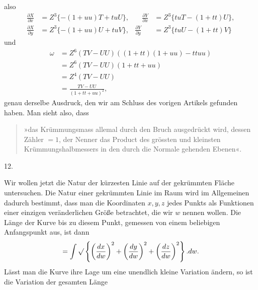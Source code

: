 %
also
\[
\begin{aligned}
\frac{\partial X}{\partial x}&=Z^{3}\{-(1+uu)T+tuU\},&\quad\frac{\partial Y}{\partial x}&=Z^{3}\{tuT-(1+tt)U\},\\
\frac{\partial X}{\partial y}&=Z^{3}\{-(1+uu)U+tuV\},&\frac{\partial Y}{\partial y}&=Z^{3}\{tuU-(1+tt)V\}
\end{aligned}
\]
und
\[
\begin{aligned}
\omega&=Z^{6}(TV-UU)((1+tt)(1+uu)-ttuu)\\
&=Z^{6}(TV-UU)(1+tt+uu)\\
&=Z^{4}(TV-UU)\\
&=\frac{TV-UU}{(1+tt+uu)^{2}},
\end{aligned}
\]
genau derselbe Ausdruck, den wir am Schluss des vorigen Artikels gefunden haben. Man sieht also, dass
\begin{quote}
»das Krümmungsmass allemal durch den Bruch ausgedrückt wird, dessen Zähler $=1$, der Nenner das Product des grössten und kleinsten Krümmungshalbmessers in den durch die Normale gehenden Ebenen«.
\end{quote}

\begin{center}12.\end{center}
\noindent\hspace*{1.2em}Wir wollen jetzt die Natur der kürzesten Linie auf der gekrümmten Fläche untersuchen. Die Natur einer gekrümmten Linie im Raum wird im Allgemeinen dadurch bestimmt, dass man die Koordinaten $x,y,z$ jedes Punkts als Funktionen einer einzigen veränderlichen Größe betrachtet, die wir $w$ nennen wollen. Die Länge der Kurve bis zu diesem Punkt, gemessen von einem beliebigen Anfangspunkt aus, ist dann
\[
=\int\mathord{\surd}\left\{\left(\frac{dx}{dw}\right)^{2}+\left(\frac{dy}{dw}\right)^{2}+\left(\frac{dz}{dw}\right)^{2}\right\}.dw.
\]
Lässt man die Kurve ihre Lage um eine unendlich kleine Variation ändern, so ist die Variation der gesamten Länge
